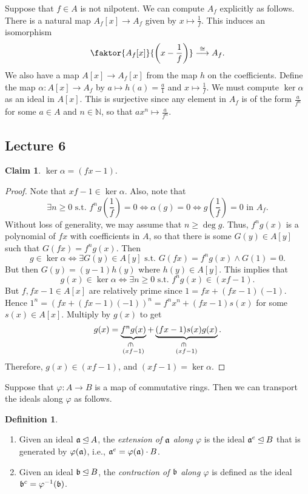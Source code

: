 \documentclass[10pt,letterpaper,cm]{nupset}
\theoremstyle{definition}
\newtheorem{definition}{Definition}[subsection]
\theoremstyle{theorem}
\newtheorem*{claim}{Claim}
\theoremstyle{remark}
\newcommand{\N}{\mathbb N}
\newcommand{\1}{\mathbf{1}}
\newcommand{\0}{\vec 0}
\begin{document}
\smallskip

Suppose that $f\in A$ is not nilpotent. We can compute $A_f$ explicitly as follows. There is a natural map $A_f[x] \to A_f$ given by $x \mapsto \frac{1}{f}$. This induces an isomorphism $$\faktor{A_f[x]}{\left(x-\frac{1}{f}\right)} \overset{\cong}{\longrightarrow} A_f.$$ We also have a map $A[x] \to A_f[x]$ from the  map $h$ on the coefficients. Define the map $\alpha: A[x] \to A_f$ by $a \mapsto h(a) = \frac{a}{1}$ and $x\mapsto \frac{1}{f}$. We must compute $\ker{\alpha}$ as an ideal in $A[x]$. This is surjective since any element in $A_f$ is of the form $\frac{a}{f^n}$ for some $a\in A $ and $n\in \N$, so that $ax^n \mapsto \frac{a}{f^n}$.

\subsection{Lecture 6}

\newcommand{\invin}{%
\mathrel{\reflectbox{\rotatebox[origin=c]{270}{$\in$}}}}

\begin{claim}
$\ker{\alpha} = (fx-1)$.
\end{claim}
\begin{proof}
Note that $xf-1\in \ker{\alpha}$. Also, note that  $$ \exists n\geq 0 \text{ s.t. } f^ng\left(\frac{1}{f}\right)=0 \iff  \alpha(g) = 0 \iff  g\left(\frac{1}{f}\right) = 0 \text{ in } A_f.$$ Without loss of generality, we may assume that $n\geq \deg{g}$. Thus, $f^ng(x)$ is a polynomial of $fx$ with coefficients in $A$, so that there is some $G(y) \in A[y]$ such that $G(fx) = f^ng(x)$. Then $$g\in \ker{\alpha} \iff \exists G(y) \in A[y] \text{ s.t. } G(fx) = f^ng(x) \land G(1) =0.$$ But then $G(y) = (y-1)h(y)$ where $h(y) \in A[y]$. This implies that $$g(x) \in \ker{\alpha} \iff \exists n\geq 0 \text{ s.t. } f^ng(x) \in (xf -1).$$ But $f, fx-1 \in A[x]$ are relatively prime since $1= fx + (fx-1)(-1)$.  Hence $1^n = (fx + (fx-1)(-1))^n = f^n x^n + (fx-1)s(x)$ for some $s(x) \in A[x]$. Multiply by $g(x)$ to get $$  g(x) = \underbrace{f^ng(x)}_{\overset{\invin}{(xf-1)}} + \underbrace{(fx -1)s(x)g(x)}_{\overset{\invin}{(xf-1)}}  .$$ Therefore, $g(x) \in (xf-1)$, and $(xf-1)=  \ker{\alpha}$. 
\end{proof}

Suppose that $\varphi : A \to B$ is a map of commutative rings. Then we can transport the ideals along $\varphi$ as follows. 

\begin{definition} $ $
\begin{enumerate}
\item
Given an ideal $\frak{a} \unlhd A$, the \textit{extension of $\frak{a}$ along $\varphi$} is the ideal $\frak{a}^e \unlhd B$ that is generated by $\varphi(\frak{a})$, i.e., $\frak{a}^e = \varphi(\frak{a}) \cdot B$.  
\item Given an ideal $\frak{b} \unlhd B$, the \textit{contraction of $\frak{b}$ along $\varphi$} is defined as the ideal $\frak{b}^c = \varphi^{-1}(\frak{b})$. 
\end{enumerate}
\end{definition}
\end{document}
